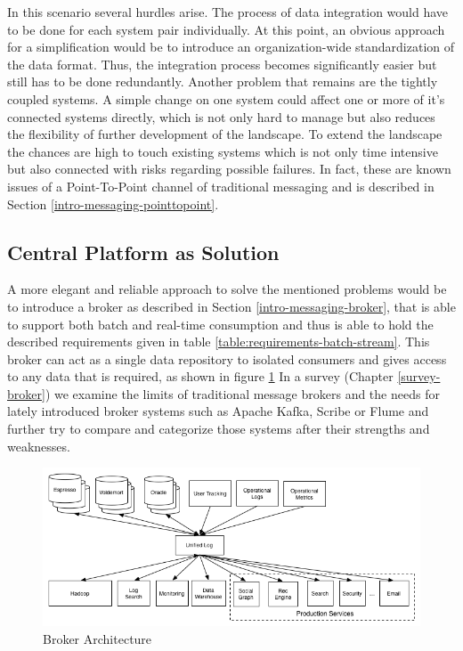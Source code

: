 In this scenario several hurdles arise. The process of data integration would
have to be done for each system pair individually. At this point, an obvious
approach for a simplification would be to introduce an organization-wide
standardization of the data format. Thus, the integration process becomes 
significantly easier but still has to be done redundantly. Another problem that
remains are the tightly coupled systems. A simple change on one system could
affect one or more of it's connected systems directly, which is not only hard to
manage but also reduces the flexibility of further development of the landscape.
To extend the landscape the chances are high to touch existing systems which is
not only time intensive but also connected with risks regarding possible failures. In fact,
these are known issues of a Point-To-Point channel of traditional messaging and
is described in Section \ref{intro-messaging-pointtopoint}.

\subsection{Central Platform as Solution}
\label{intro-datastream-centralplatform}
A more elegant and reliable approach to solve the mentioned problems would be to
introduce a broker as described in Section \ref{intro-messaging-broker}, that is 
able to support both batch and real-time consumption and thus is able to hold
the described requirements given in table \ref{table:requirements-batch-stream}. 
This broker can act as a single data repository to isolated consumers and gives
access to any data that is required, as shown in figure
\ref{fig:datapipeline_simple} In a survey (Chapter \ref{survey-broker}) we examine the limits of
traditional message brokers and the needs for lately introduced broker systems
such as Apache Kafka\cite{apachekafka}, Scribe\cite{scribe} or
Flume\cite{apacheflume} and further try to compare and categorize those
systems after their strengths and weaknesses.

\begin{figure}[H]
    \centering
    \includegraphics[width=1.0\textwidth]{images/datapipeline_simple.png}
    \caption{Broker Architecture}
    \label{fig:datapipeline_simple}
\end{figure}

